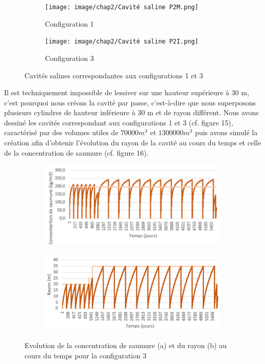 \documentclass[11pt,french,a4paper]{article}
\begin{document}
\begin{figure}[!h]
  \centering
  \begin{subfigure}[b]{0.20\linewidth}
    \texttt{[image: image/chap2/Cavité saline P2M.png]}
    \caption{Configuration 1}
  \end{subfigure}
  \begin{subfigure}[b]{0.20\linewidth}
    \texttt{[image: image/chap2/Cavité saline P2I.png]}
    \caption{Configuration 3 }
  \end{subfigure}
  \caption{Cavités salines correspondantes aux configurations 1 et 3}
\end{figure}


Il est techniquement impossible de lessiver sur une hauteur supérieure à 30 m, c’est pourquoi nous créons la cavité par passe, c’est-à-dire que nous superposons plusieurs cylindres de hauteur inférieure à 30 m et de rayon différent.
Nous avons dessiné les cavités correspondant aux configurations 1 et 3 (cf. figure 15), caractérisé par des volumes utiles de $70000 m^3$ et $1300000 m^3$ puis avons simulé la création afin d'obtenir l’évolution du rayon de la cavité au cours du temps et celle de la concentration de saumure (cf. figure 16).


\begin{figure}[h]
  \centering
  \begin{subfigure}[b]{0.4\linewidth}
    \includegraphics[width=\linewidth]{image/chap2/Graphe concentration C3 100.png}
    \caption{ }
  \end{subfigure}
  \begin{subfigure}[b]{0.43\linewidth}
    \includegraphics[width=\linewidth]{image/chap2/Graphe rayon C3 100.png}
    \caption{ }
  \end{subfigure}
  \caption{Evolution de la concentration de saumure (a) et du rayon (b) au cours du temps pour la configuration 3 }
\end{figure}
\end{document}
